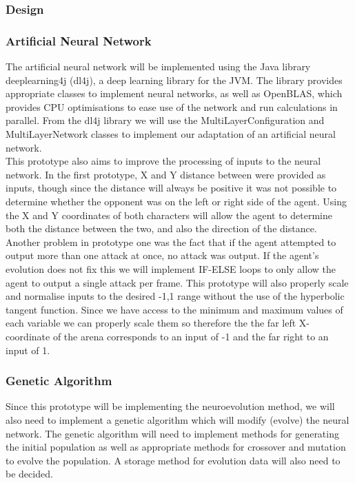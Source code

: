 \documentclass[12pt,a4paper]{article}
\begin{document}
\newpage
\subsubsection{Design}
\subsubsection*{Artificial Neural Network}

\vspace{3mm}

The artificial neural network will be implemented using the Java library deeplearning4j (dl4j), a deep learning library for the JVM. The library provides appropriate classes to implement neural networks, as well as OpenBLAS, which provides CPU optimisations to ease use of the network and run calculations in parallel. From the dl4j library we will use the MultiLayerConfiguration and MultiLayerNetwork classes to implement our adaptation of an artificial neural network.\\

This prototype also aims to improve the processing of inputs to the neural network. In the first prototype, X and Y distance between were provided as inputs, though since the distance will always be positive it was not possible to determine whether the opponent was on the left or right side of the agent. Using the X and Y coordinates of both characters will allow the agent to determine both the distance between the two, and also the direction of the distance. Another problem in prototype one was the fact that if the agent attempted to output more than one attack at once, no attack was output. If the agent's evolution does not fix this we will implement IF-ELSE loops to only allow the agent to output a single attack per frame. This prototype will also properly scale and normalise inputs to the desired -1,1 range without the use of the hyperbolic tangent function. Since we have access to the minimum and maximum values of each variable we can properly scale them so therefore the the far left X-coordinate of the arena corresponds to an input of -1 and the far right to an input of 1.\\

\subsubsection*{Genetic Algorithm}

\vspace{3mm}

Since this prototype will be implementing the neuroevolution method, we will also need to implement a genetic algorithm which will modify (evolve) the neural network. The genetic algorithm will need to implement methods for generating the initial population as well as appropriate methods for crossover and mutation to evolve the population. A storage method for evolution data will also need to be decided.\\
\end{document}
